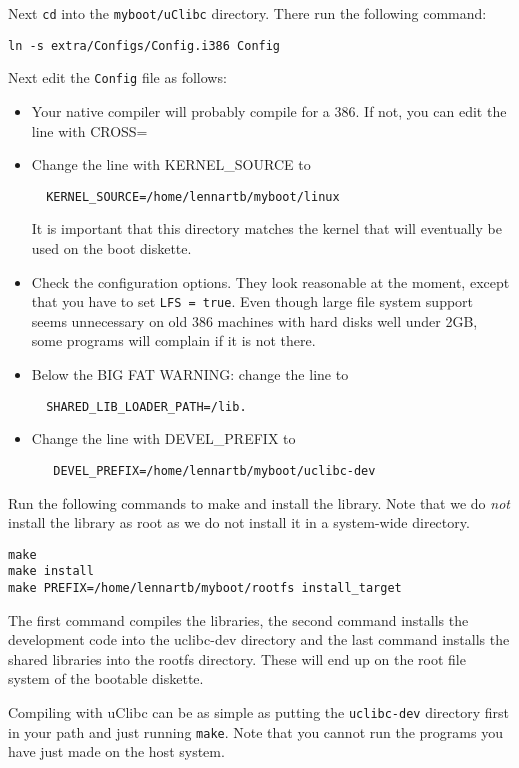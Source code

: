 \documentclass[12pt,a4paper]{article}
\begin{document}
Next {\tt cd} into the {\tt myboot/uClibc} directory. There run the following
command:
\begin{verbatim}
ln -s extra/Configs/Config.i386 Config
\end{verbatim}

Next edit the {\tt Config} file as follows:
\begin{itemize}
\item Your native compiler will probably compile for a 386. If not,
  you can edit the line with CROSS=
\item Change the line with KERNEL\_SOURCE to
\begin{verbatim} 
  KERNEL_SOURCE=/home/lennartb/myboot/linux
\end{verbatim}
  It is important that this directory matches the kernel that will
  eventually be used on the boot diskette.
\item Check the configuration options. They look reasonable at the
  moment, except that you have to set {\tt LFS = true}. Even though
  large file system support seems unnecessary on old 386 machines with
  hard disks well under 2GB, some programs will complain if it is not there.
\item Below the BIG FAT WARNING: change the line to 
\begin{verbatim}
  SHARED_LIB_LOADER_PATH=/lib.
\end{verbatim}
\item Change the line with DEVEL\_PREFIX to 
  \begin{verbatim}
   DEVEL_PREFIX=/home/lennartb/myboot/uclibc-dev
  \end{verbatim}
\end{itemize}

Run the following commands to make and install the library. Note that
we do {\em not} install the library as root as we do not install it in
a system-wide directory.
\begin{verbatim}
make
make install
make PREFIX=/home/lennartb/myboot/rootfs install_target
\end{verbatim}

The first command compiles the libraries, the second command installs
the development code into the uclibc-dev directory and the last
command installs the shared libraries into the rootfs directory. These
will end up on the root file system of the bootable diskette.

Compiling with uClibc can be as simple as putting the {\tt uclibc-dev}
directory first in your path and just running {\tt make}. Note that
you cannot run the programs you have just made on the host system.
\end{document}
